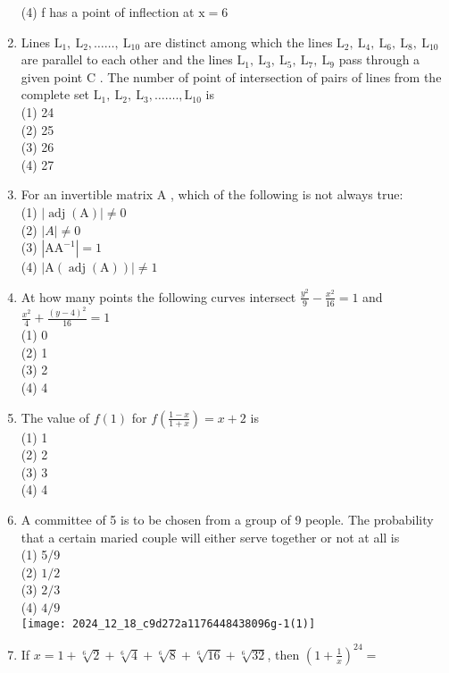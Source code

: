 \documentclass[10pt]{article}
\begin{document}
\begin{enumerate}
(4) f has a point of inflection at $\mathrm{x}=6$
  \item Lines $\mathrm{L}_{1}, \mathrm{~L}_{2}, \ldots \ldots, \mathrm{~L}_{10}$ are distinct among which the lines $\mathrm{L}_{2}, \mathrm{~L}_{4}, \mathrm{~L}_{6}, \mathrm{~L}_{8}, \mathrm{~L}_{10}$ are parallel to each other and the lines $\mathrm{L}_{1}, \mathrm{~L}_{3}, \mathrm{~L}_{5}, \mathrm{~L}_{7}, \mathrm{~L}_{9}$ pass through a given point C . The number of point of intersection of pairs of lines from the complete set $\mathrm{L}_{1}, \mathrm{~L}_{2}, \mathrm{~L}_{3}, \ldots \ldots ., \mathrm{L}_{10}$ is\\
(1) 24\\
(2) 25\\
(3) 26\\
(4) 27
  \item For an invertible matrix A , which of the following is not always true:\\
(1) $|\operatorname{adj}(\mathrm{A})| \neq 0$\\
(2) $|A| \neq 0$\\
(3) $\left|\mathrm{AA}^{-1}\right|=1$\\
(4) $|\mathrm{A}(\operatorname{adj}(\mathrm{A}))| \neq 1$
  \item At how many points the following curves intersect $\frac{y^{2}}{9}-\frac{x^{2}}{16}=1$ and $\frac{x^{2}}{4}+\frac{(y-4)^{2}}{16}=1$\\
(1) 0\\
(2) 1\\
(3) 2\\
(4) 4
  \item The value of $f(1)$ for $f\left(\frac{1-x}{1+x}\right)=x+2$ is\\
(1) 1\\
(2) 2\\
(3) 3\\
(4) 4
  \item A committee of 5 is to be chosen from a group of 9 people. The probability that a certain maried couple will either serve together or not at all is\\
(1) 5/9\\
(2) $1 / 2$\\
(3) $2 / 3$\\
(4) $4 / 9$\\
\texttt{[image: 2024\_12\_18\_c9d272a1176448438096g-1(1)]}
  \item If $x=1+\sqrt[6]{2}+\sqrt[6]{4}+\sqrt[6]{8}+\sqrt[6]{16}+\sqrt[6]{32}$, then $\left(1+\frac{1}{x}\right)^{24}=$\\

\end{enumerate}
\end{document}
